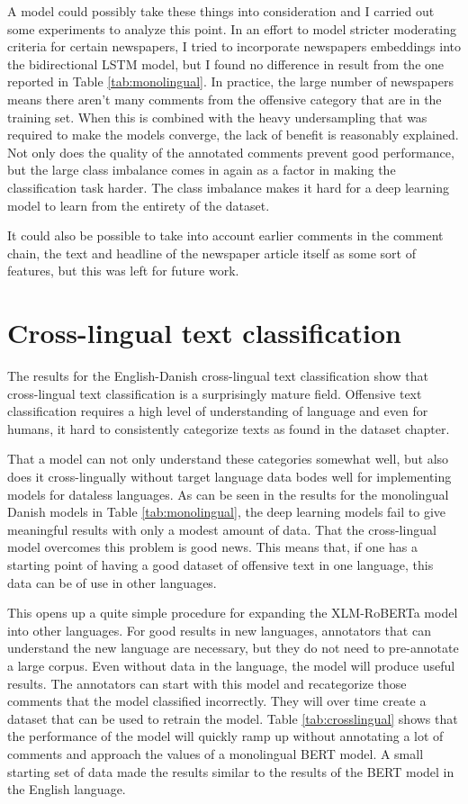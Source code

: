 \documentclass[nofilelist]{cslthse-msc}
\begin{document}
A model could possibly take these things into consideration and I carried out some experiments to analyze this point. In an effort to model stricter moderating criteria for certain newspapers, I tried to incorporate newspapers embeddings into the bidirectional LSTM model, but I found no difference in result from the one reported in Table \ref{tab:monolingual}. In practice, the large number of newspapers means there aren't many comments from the offensive category that are in the training set. When this is combined with the heavy undersampling that was required to make the models converge, the lack of benefit is reasonably explained. Not only does the quality of the annotated comments prevent good performance, but the large class imbalance comes in again as a factor in making the classification task harder. The class imbalance makes it hard for a deep learning model to learn from the entirety of the dataset.  

It could also be possible to take into account earlier comments in the comment chain, the text and headline of the newspaper article itself as some sort of features, but this was left for future work.

\section{Cross-lingual text classification}

The results for the English-Danish cross-lingual text classification show that cross-lingual text classification is a surprisingly mature field. Offensive text classification requires a high level of understanding of language and even for humans, it hard to consistently categorize texts as found in the dataset chapter. 

That a model can not only understand these categories somewhat well, but also does it cross-lingually without target language data bodes well for implementing models for dataless languages. As can be seen in the results for the monolingual Danish models in Table \ref{tab:monolingual}, the deep learning models fail to give meaningful results with only a modest amount of data. That the cross-lingual model overcomes this problem is good news. This means that, if one has a starting point of having a good dataset of offensive text in one language, this data can be of use in other languages. 

This opens up a quite simple procedure for expanding the XLM-RoBERTa model into other languages. For good results in new languages, annotators that can understand the new language are necessary, but they do not need to pre-annotate a large corpus. Even without data in the language, the model will produce useful results. The annotators can start with this model and recategorize those comments that the model classified incorrectly. They will over time create a dataset that can be used to retrain the model. Table \ref{tab:crosslingual} shows that the performance of the model will quickly ramp up without annotating a lot of comments and approach the values of a monolingual BERT model. A small starting set of data  made the results similar to the results of the BERT model in the English language. 
\end{document}
